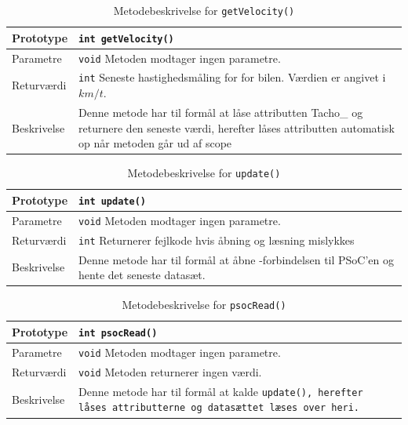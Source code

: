 \begin{table}[h]
	\begin{tabularx}{\textwidth}{| L{2.5 cm} | Z |} \hline
		Prototype 	& \texttt{int getVelocity()} \\\hline
		Parametre 	& \texttt{void} \newline Metoden modtager ingen parametre. \\\hline
		Returværdi 	& \texttt{int}  \newline Seneste hastighedsmåling for for bilen. Værdien er angivet i $km/t$. \\\hline
		Beskrivelse	& Denne metode har til formål at låse attributten Tacho\_ og returnere den seneste værdi, herefter låses attributten automatisk op når metoden går ud af scope \\\hline	
	\end{tabularx}
	\caption{Metodebeskrivelse for  \texttt{getVelocity()}}
	\label{table:met_getvelocity}
\end{table}

\begin{table}[h]
	\begin{tabularx}{\textwidth}{| L{2.5 cm} | Z |} \hline
		Prototype 	& \texttt{int update()} \\\hline
		Parametre 	& \texttt{void} \newline Metoden modtager ingen parametre. \\\hline
		Returværdi 	& \texttt{int}  \newline Returnerer fejlkode hvis åbning og læsning mislykkes \\\hline
		Beskrivelse	& Denne metode har til formål at åbne \IIC-forbindelsen til PSoC'en og hente det seneste datasæt. \\\hline
	\end{tabularx}
	\caption{Metodebeskrivelse for  \texttt{update()}}
	\label{table:met_update}
\end{table}
\clearpage

\begin{table}[h]
	\begin{tabularx}{\textwidth}{| L{2.5 cm} | Z |} \hline
		Prototype 	& \texttt{int psocRead()} \\\hline
		Parametre 	& \texttt{void} \newline Metoden modtager ingen parametre. 	\\\hline
		Returværdi 	& \texttt{void} \newline Metoden returnerer ingen værdi. 	\\\hline
		Beskrivelse	& Denne metode har til formål at kalde \texttt{update(), herefter låses attributterne og datasættet læses over heri.}\\\hline
	\end{tabularx}
	\caption{Metodebeskrivelse for  \texttt{psocRead()}}
	\label{table:met_psocRead}
\end{table}
\clearpage